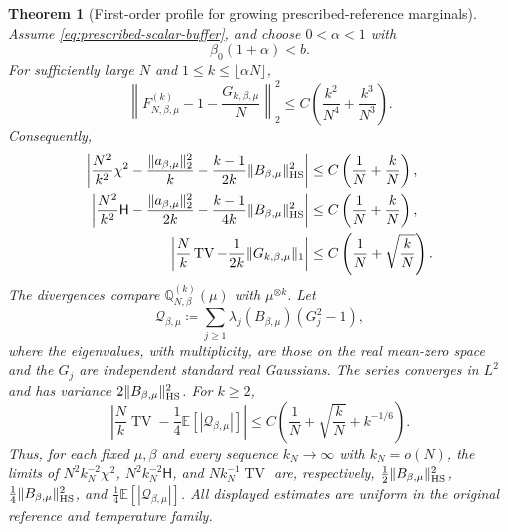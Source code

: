 \documentclass[11pt,reqno]{amsart}
\numberwithin{equation}{section}
\theoremstyle{plain}
\newtheorem{thm}{Theorem}[section]
\theoremstyle{definition}
\DeclarePairedDelimiter{\norm}{\lVert}{\rVert}
\newcommand{\E}{\mathbb E}
\newcommand{\Q}{\mathbb Q}
\newcommand{\TV}{\operatorname{TV}}
\newcommand{\HS}{\mathrm{HS}}
\newcommand{\be}{\beta}
\newcommand{\Hr}{\mathsf H}
\begin{document}
\begin{thm}[First-order profile for growing prescribed-reference marginals]
\label{thm:prescribed-growing-marginals}
Assume \eqref{eq:prescribed-scalar-buffer}, and choose $0<\alpha<1$ with
\begin{equation}
 \be_0(1+\alpha)<b.
 \label{eq:prescribed-growing-window}
\end{equation}
For sufficiently large $N$ and $1\leq k\leq\lfloor\alpha N\rfloor$,
\begin{equation}
 \left\|F_{N,\be,\mu}^{(k)}-1-\frac{G_{k,\be,\mu}}N\right\|_2^2
 \leq C\left(\frac{k^2}{N^4}+\frac{k^3}{N^3}\right).
 \label{eq:prescribed-growing-profile}
\end{equation}
Consequently,
\begin{align}
 \left|\frac{N^2}{k^2}\chi^2
 -\frac{\norm{a_{\be,\mu}}_2^2}{k}
 -\frac{k-1}{2k}\norm{B_{\be,\mu}}_{\HS}^2\right|
 &\leq C\left(\frac1N+\frac{k}{N}\right),
 \label{eq:prescribed-growing-chi}\\
 \left|\frac{N^2}{k^2}\Hr
 -\frac{\norm{a_{\be,\mu}}_2^2}{2k}
 -\frac{k-1}{4k}\norm{B_{\be,\mu}}_{\HS}^2\right|
 &\leq C\left(\frac1N+\frac{k}{N}\right),
 \label{eq:prescribed-growing-entropy}\\
 \left|\frac Nk\TV-\frac1{2k}\norm{G_{k,\be,\mu}}_1\right|
 &\leq C\left(\frac1N+\sqrt{\frac{k}{N}}\right).
 \label{eq:prescribed-growing-TV}
\end{align}
The divergences compare $\Q_{N,\be}^{(k)}(\mu)$ with $\mu^{\otimes k}$.  Let
\begin{equation}
 \mathcal Q_{\be,\mu}
 \coloneqq\sum_{j\geq1}\lambda_j(B_{\be,\mu})(G_j^2-1),
 \label{eq:prescribed-second-chaos}
\end{equation}
where the eigenvalues, with multiplicity, are those on the real mean-zero space and the $G_j$ are independent standard real Gaussians.  The series converges in $L^2$ and has variance $2\norm{B_{\be,\mu}}_{\HS}^2$.  For $k\geq2$,
\begin{equation}
 \left|\frac Nk\TV-\frac14\E[|\mathcal Q_{\be,\mu}|]\right|
 \leq C\left(\frac1N+\sqrt{\frac{k}{N}}+k^{-1/6}\right).
 \label{eq:prescribed-growing-TV-chaos}
\end{equation}
Thus, for each fixed $\mu,\be$ and every sequence $k_N\to\infty$ with $k_N=o(N)$, the limits of $N^2k_N^{-2}\chi^2$, $N^2k_N^{-2}\Hr$, and $Nk_N^{-1}\TV$ are, respectively, $\frac12\norm{B_{\be,\mu}}_{\HS}^2$, $\frac14\norm{B_{\be,\mu}}_{\HS}^2$, and $\frac14\E[|\mathcal Q_{\be,\mu}|]$.  All displayed estimates are uniform in the original reference and temperature family.
\end{thm}
\end{document}
